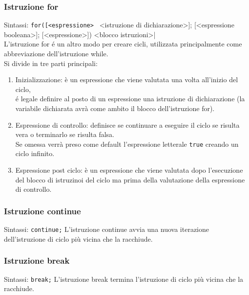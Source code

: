 \subsubsection{Istruzione for}
Sintassi: \verb|for([<espressione> | <istruzione di dichiarazione>]; [<espressione booleana>]; [<espressione>]) <blocco istruzioni>| \\
L'istruzione for é un altro modo per creare cicli, utilizzata principalmente come abbreviazione
dell'istruzione while. \\
Si divide in tre parti principali:
\begin{enumerate}
    \item {
        Inizializzazione: è un espressione che viene valutata una volta all'inizio del ciclo, \\
        é legale definire al posto di un espressione una istruzione di dichiarazione
        (la variabile dichiarata avrà come ambito il blocco dell'istruzione for).
    }
    \item { 
        Espressione di controllo: definisce se continuare a eseguire il ciclo se risulta vera 
        o terminarlo se risulta falsa. \\
        Se omessa verrà preso come default l'espressione letterale \verb|true| creando un ciclo infinito.
    }
    \item {
        Espressione post ciclo: è un espressione che viene valutata dopo l'esecuzione del blocco di istruzinoi 
        del ciclo ma prima della valutazione della espressione di controllo.
    }
\end{enumerate}

\subsubsection{Istruzione continue}
Sintassi: \verb|continue;|
L'istruzione continue avvia una nuova iterazione dell'istruzione di ciclo più vicina che la racchiude.

\subsubsection{Istruzione break}
Sintassi: \verb|break;|
L'istruzione break termina l'istruzione di ciclo più vicina che la racchiude.

